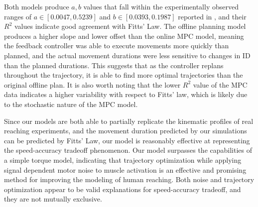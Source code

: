 \documentclass[letterpaper, 10pt, conference]{ieeeconf}
\newcommand{\todo}[1]{\textcolor{red}{\textbf{TODO:} #1}}
\begin{document}
Both models produce $a,b$ values that fall within the experimentally observed ranges of $a \in [0.0047, 0.5239]$ and $b \in [0.0393,0.1987]$ reported in \cite{fitts_law_exp_data}, and their $R^2$ values indicate good agreement with Fitts' Law.
The offline planning model produces a higher slope and lower offset than the online MPC model, meaning the feedback controller was able to execute movements more quickly than planned, and the actual movement durations were less sensitive to changes in ID than the planned durations. This suggests that as the controller replans throughout the trajectory, it is able to find more optimal trajectories than the original offline plan.
It is also worth noting that the lower $R^2$ value of the MPC data indicates a higher variability with respect to Fitts' law, which is likely due to the stochastic nature of the MPC model.


Since our models are both able to partially replicate the kinematic profiles of real reaching experiments, and the movement duration predicted by our simulations can be predicted by Fitts' Law, our model is reasonably effective at representing the speed-accuracy tradeoff phenomenon.
Our model surpasses the capabilities of a simple torque model, indicating that trajectory optimization while applying signal dependent motor noise to muscle activation is an effective and promising method for improving the modeling of human reaching.
Both noise and trajectory optimization appear to be valid explanations for speed-accuracy tradeoff, and they are not mutually exclusive.
\end{document}
